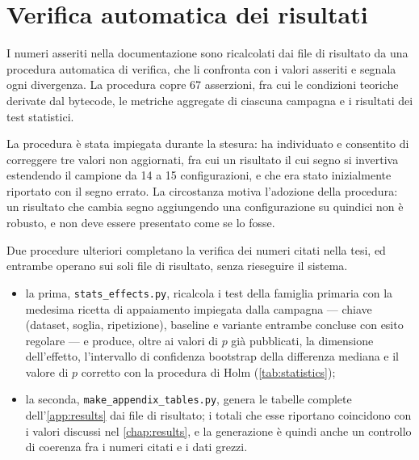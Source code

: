 \section{Verifica automatica dei risultati}\label{sec:appendix-audit}

I numeri asseriti nella documentazione sono ricalcolati dai file di risultato da una procedura
automatica di verifica, che li confronta con i valori asseriti e segnala ogni divergenza. La
procedura copre \num{67} asserzioni, fra cui le condizioni teoriche derivate dal bytecode, le
metriche aggregate di ciascuna campagna e i risultati dei test statistici.

La procedura è stata impiegata durante la stesura: ha individuato e consentito di correggere tre
valori non aggiornati, fra cui un risultato il cui segno si invertiva estendendo il campione da
\num{14} a \num{15} configurazioni, e che era stato inizialmente riportato con il segno errato.
La circostanza motiva l'adozione della procedura: un risultato che cambia segno aggiungendo una
configurazione su quindici non è robusto, e non deve essere presentato come se lo fosse.

Due procedure ulteriori completano la verifica dei numeri citati nella tesi, ed entrambe operano
sui soli file di risultato, senza rieseguire il sistema.

\begin{sloppypar}
\begin{itemize}[leftmargin=1.4em]
    \item la prima, \texttt{stats\_effects.py}, ricalcola i test della famiglia primaria con la
    medesima ricetta di appaiamento impiegata dalla campagna --- chiave (dataset, soglia,
    ripetizione), baseline e variante entrambe concluse con esito regolare --- e produce, oltre ai
    valori di $p$ già pubblicati, la dimensione dell'effetto, l'intervallo di confidenza bootstrap
    della differenza mediana e il valore di $p$ corretto con la procedura di Holm
    (\autoref{tab:statistics});
    \item la seconda, \texttt{make\_appendix\_tables.py}, genera le tabelle complete
    dell'\autoref{app:results} dai file di risultato; i totali che esse riportano coincidono con
    i valori discussi nel \autoref{chap:results}, e la generazione è quindi anche un controllo di
    coerenza fra i numeri citati e i dati grezzi.
\end{itemize}
\end{sloppypar}


